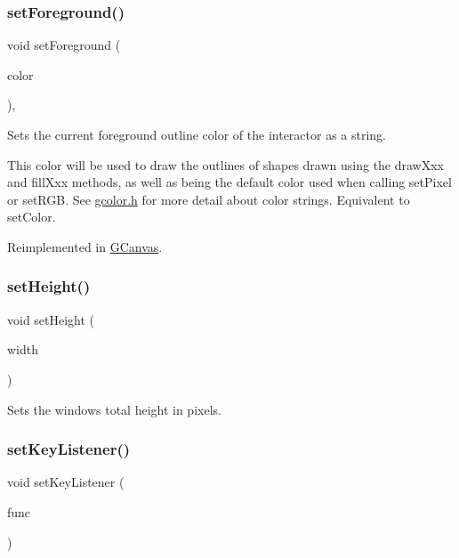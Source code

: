 \subsubsection{\texorpdfstring{set\+Foreground()}{setForeground()}\hspace{0.1cm}{\footnotesize\ttfamily [2/2]}}
{\footnotesize\ttfamily void set\+Foreground (\begin{DoxyParamCaption}\item[{const std\+::string \&}]{color }\end{DoxyParamCaption})\hspace{0.3cm}{\ttfamily [virtual]}, {\ttfamily [inherited]}}



Sets the current foreground outline color of the interactor as a string. 

This color will be used to draw the outlines of shapes drawn using the draw\+Xxx and fill\+Xxx methods, as well as being the default color used when calling set\+Pixel or set\+R\+GB. See \mbox{\hyperlink{gcolor_8h_source}{gcolor.\+h}} for more detail about color strings. Equivalent to set\+Color. 

Reimplemented in \mbox{\hyperlink{classGCanvas_a088e04dfc56273df4cedab2b11b970f5}{G\+Canvas}}.

\mbox{\label{classGWindow_a4b812426e19cdd9f6d62e7b5d90e6bec}} 
\subsubsection{\texorpdfstring{set\+Height()}{setHeight()}}
{\footnotesize\ttfamily void set\+Height (\begin{DoxyParamCaption}\item[{double}]{width }\end{DoxyParamCaption})\hspace{0.3cm}{\ttfamily [virtual]}}



Sets the window\textquotesingle{}s total height in pixels. 

\mbox{\label{classGWindow_aeb8324d3287fa1fbe093f4d6230cf0a6}} 
\subsubsection{\texorpdfstring{set\+Key\+Listener()}{setKeyListener()}\hspace{0.1cm}{\footnotesize\ttfamily [1/2]}}
{\footnotesize\ttfamily void set\+Key\+Listener (\begin{DoxyParamCaption}\item[{G\+Event\+Listener}]{func }\end{DoxyParamCaption})\hspace{0.3cm}{\ttfamily [virtual]}}



